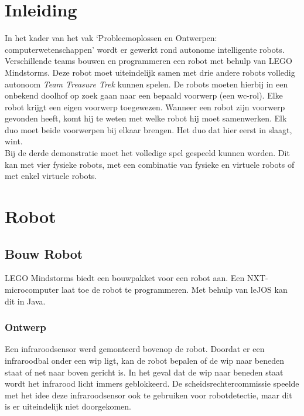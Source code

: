 \documentclass[tt3]{penoverslag}
\begin{document}
\newpage
\setcounter{tocdepth}{3}
\tableofcontents
\newpage

\section{Inleiding} %
\label{ssec:Inl}
In het kader van het vak `Probleemoplossen en Ontwerpen: computerwetenschappen' wordt er gewerkt rond autonome intelligente robots. Verschillende teams bouwen en programmeren een robot met behulp van LEGO Mindstorms. Deze robot moet uiteindelijk samen met drie andere robots volledig autonoom \textit{Team Treasure Trek} kunnen spelen.
De robots moeten hierbij in een onbekend doolhof op zoek gaan naar een bepaald voorwerp (een wc-rol). Elke robot krijgt een eigen voorwerp toegewezen. Wanneer een robot zijn voorwerp gevonden heeft, komt hij te weten met welke robot hij moet samenwerken. Elk duo moet beide voorwerpen bij elkaar brengen. Het duo dat hier eerst in slaagt, wint.\\

Bij de derde demonstratie moet het volledige spel gespeeld kunnen worden. Dit kan met vier fysieke robots, met een combinatie van fysieke en virtuele robots of met  enkel virtuele robots.

\section{Robot}
\label{ssec:Robot}

\subsection{Bouw Robot}
\label{ssec:Bouw}
LEGO Mindstorms biedt een bouwpakket voor een robot aan. Een NXT-microcomputer laat toe de robot te programmeren. Met behulp van leJOS kan dit in Java.

\subsubsection{Ontwerp}
\label{ssec:FysB}
Een infraroodsensor werd gemonteerd bovenop de robot. Doordat er een infraroodbal onder een wip ligt, kan de robot bepalen of de wip naar beneden staat of net naar boven gericht is. In het geval dat de wip naar beneden staat wordt het infrarood licht immers geblokkeerd. De scheidsrechtercommissie speelde met het idee deze infraroodsensor ook te gebruiken voor robotdetectie, maar dit is er uiteindelijk niet doorgekomen.\\
\end{document}
